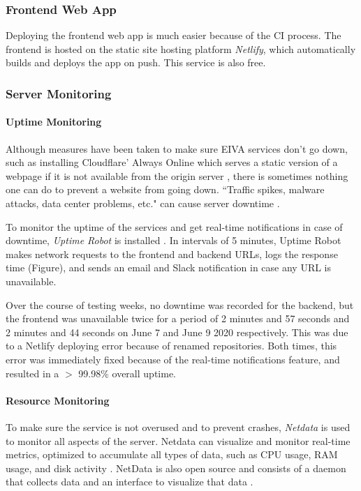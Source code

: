 \documentclass{article}
\begin{document}
\subsubsection{Frontend Web App}

Deploying the frontend web app is much easier because of the CI process. The frontend is hosted on the static site hosting platform \emph{Netlify}, which automatically builds and deploys the app on push. This service is also free.

\subsubsection{Server Monitoring}

\paragraph{Uptime Monitoring}

Although measures have been taken to make sure EIVA services don't go down, such as installing Cloudflare' Always Online which serves a static version of a webpage if it is not available from the origin server \cite{noauthor_keep_nodate}, there is sometimes nothing one can do to prevent a website from going down. ``Traffic spikes, malware attacks, data center problems, etc." can cause server downtime \cite{noauthor_what_2018}.

To monitor the uptime of the services and get real-time notifications in case of downtime, \emph{Uptime Robot} is installed \cite{noauthor_about_nodate}. In intervals of 5 minutes, Uptime Robot makes network requests to the frontend and backend URLs, logs the response time (Figure), and sends an email and Slack notification in case any URL is unavailable.

Over the course of testing weeks, no downtime was recorded for the backend, but the frontend was unavailable twice for a period of 2 minutes and 57 seconds and 2 minutes and 44 seconds on June 7 and June 9 2020 respectively. This was due to a Netlify deploying error because of renamed repositories. Both times, this error was immediately fixed because of the real-time notifications feature, and resulted in a $>$ 99.98\% overall uptime.

\paragraph{Resource Monitoring}

To make sure the service is not overused and to prevent crashes, \emph{Netdata} is used to monitor all aspects of the server. Netdata can visualize and monitor real-time metrics, optimized to accumulate all types of data, such as CPU usage, RAM usage, and disk activity \cite{noauthor_netdata_nodate}. NetData is also open source and consists of a daemon that collects data and an interface to visualize that data \cite{noauthor_netdata/netdata_2020}.
\end{document}
